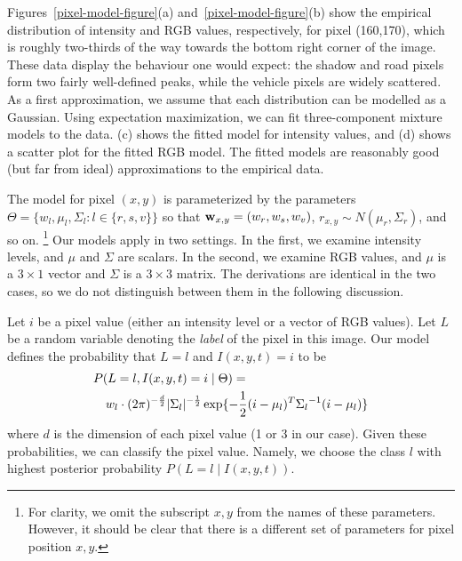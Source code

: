 Figures~\ref{pixel-model-figure}(a) and~\ref{pixel-model-figure}(b)
show the empirical distribution of intensity and RGB values,
respectively, for pixel (160,170), which is roughly two-thirds of the
way towards the bottom right corner of the image.  These data display
the behaviour one would expect: the shadow and road pixels form two
fairly well-defined peaks, while the vehicle pixels are widely
scattered.  As a first approximation, we assume that each distribution
can be modelled as a Gaussian.  Using expectation maximization, we can fit three-component mixture models to the
data. (c) shows the fitted model for
intensity values, and (d) shows a scatter
plot for the fitted RGB model. The fitted models are reasonably good
(but far from ideal) approximations to the empirical data.


The model for pixel $(x,y)$ is parameterized by the parameters $\Theta
= \{
w_l, \mu_l, \Sigma_l : l \in \{ r, s, v \}\}$ so that $\mbox{{\bf w}}_{x,y} = (w_r,
w_s, w_v )$, $r_{x,y} \sim N(\mu_r,\Sigma_r)$, and so on.%
\footnote{For clarity, we omit the subscript $x,y$ from the names of
these parameters. However, it should be clear that there is a
different set of parameters for pixel position $x,y$.}
Our models apply in two settings. In the first, we examine intensity
levels, and $\mu$ and $\Sigma$ are scalars. In the second, we examine
RGB values, and $\mu$ is a $3\times 1$ vector and $\Sigma$ is a $3\times 3$
matrix. The derivations are identical in the two cases, so we do not
distinguish between them in the following discussion.

Let $i$ be a pixel value (either an intensity level or a vector of RGB
values). Let $L$ be a random variable denoting the {\em label\/} of
the pixel in this image. Our model defines the probability that $L =
l$ and $I(x,y,t) = i$ to be
\begin{eqnarray*}
\lefteqn{P( L = l, I(x,y,t) = i \mid \Theta ) = {}} \\
 & &  w_l \cdot
(2\pi)^{-\frac{d}{2}}|\Sigma_l|^{-\frac{1}{2}} \exp\{-\frac{1}{2}(i -
\mu_l)^T {\Sigma_l}^{-1} (i - \mu_l)\}
\end{eqnarray*}
where $d$ is the dimension of each pixel value (1 or 3 in our case).
Given these probabilities, we can classify the pixel value. Namely, we
choose the class $l$ with highest posterior  probability $P( L = l \mid I(x,y,t)) $.



